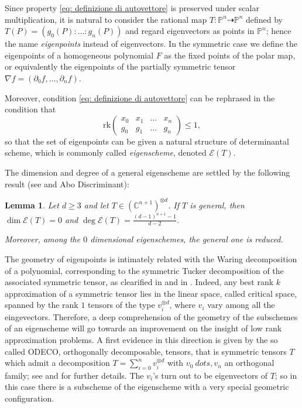 \documentclass{amsart}
\theoremstyle{plain}
\newtheorem{lemma}{Lemma}[section]
\theoremstyle{definition}
\newcommand{\C}{\mathbb{C}}
\newcommand{\p}{\mathbb{P}}
\newcommand{\de}{\partial}
\newcommand{\Eig}[1]{\mathcal{E}\!\left( {#1} \right)}
\newcommand{\rk}{\ensuremath{\mathrm{rk}}}
\begin{document}
Since %
property \eqref{eq: definizione di autovettore} is preserved under scalar multiplication, it is natural to consider the rational map $T:\p^n\dashrightarrow\p^n$ defined by $T(P)=(g_0(P):\ldots:g_n(P))$ and regard eigenvectors as points in $\p^n$; hence the name \emph{eigenpoints} instead of eigenvectors. In the symmetric case we define the eigenpoints of a homogeneous polynomial $F$ as the fixed points of the polar map, or equivalently the eigenpoints of the partially symmetric tensor $\nabla f =(\de_0f,\dots,\de_n f)$.

Moreover, condition \eqref{eq: definizione di autovettore} can be rephrased in the condition that
\begin{equation}
\label{eq:def_matrix_general}
    \rk \begin{pmatrix}
    x_0 & x_1 & \dots & x_n \\
    g_0 & g_1 & \dots & g_n
    \end{pmatrix} \le 1,
\end{equation}
so that the set of eigenpoints can be given a natural structure of determinantal scheme, which is commonly called \emph{eigenscheme}, denoted $\Eig{T}$.

The dimension and degree of a general eigenscheme are settled by the following result (see \cite[Theorem 2.1]{CartSturm} and Abo Discriminant):

\begin{lemma}\label{lem:nonempty}
Let $d\ge 3$ and let $T \in (\C^{n+1})^{\otimes d}$.
If $T$ is general, then $\dim \Eig{T}=0$ and $\deg \Eig{T}=\frac{(d-1)^{n+1}-1}{d-2}$.

  Moreover, among the $0$ dimensional eigenschemes, the general one is reduced.
\end{lemma}

The geometry of eigenpoints is intimately related with the Waring decomposition of a polynomial,
corresponding to the symmetric Tucker decomposition of the associated symmetric tensor,
as clearified
in \cite{DOT} and in \cite{Ott}. Indeed, any best rank $k$ approximation of a symmetric tensor lies in the linear
space, called {critical space},  spanned by the rank $1$ tensors of the type $v_i ^{\otimes d}$, where $v_i$ vary among all the eingevectors. Therefore, a deep comprehension of the geometry of the subschemes of an eigenscheme will
go towards an improvement on the insight of low rank approximation problems. A first evidence in this direction is given by the so called ODECO, orthogonally decomposable, tensors, that is symmetric tensors $T$ which admit a decomposition
$T= \sum _{i=0}^n v_i ^{\otimes d}$ with $v_0 \ dots , v_n$ an orthogonal family; see \cite{Rob} and \cite{BDHE}
for further details. The $v_i$'s turn out to be eigenvectors of $T$; so in this case there is a subscheme of the eigenscheme with a very special geometric configuration.
\end{document}
